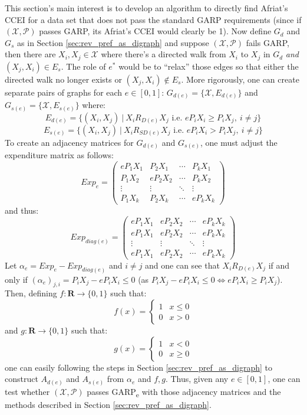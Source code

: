 \documentclass{article} %
\theoremstyle{style1}
\theoremstyle{example}
\begin{document}
This section's main interest is to develop an algorithm to directly find Afriat's CCEI for a data set that does not pass the standard GARP requirements (since if $(\mathcal{X},\mathcal{P})$ passes GARP, its Afriat's CCEI would clearly be 1). Now define $G_d$ and $G_s$ as in Section \ref{sec:rev_pref_as_digraph} and suppose $(\mathcal{X},\mathcal{P})$ fails GARP, then there are $X_i,X_j\in\mathcal{X}$ where there's a directed walk from $X_i$ to $X_j$ in $G_d$ \emph{and} $(X_j,X_i)\in E_s$. The role of $e^*$ would be to ``relax'' those edges so that either the directed walk no longer exists or $(X_j,X_i)\not\in E_s$. More rigorously, one can create separate pairs of graphs for each $e\in[0,1]$: $G_{d(e)}=\{\mathcal{X},E_{d(e)}\}$ and $G_{s(e)}=\{\mathcal{X},E_{s(e)}\}$ where:
$$E_{d(e)}=\{(X_i,X_j)\ |\ X_iR_{D(e)}X_j\textrm{ i.e. } eP_iX_i\geq P_iX_j,\ i\not=j\}$$
$$E_{s(e)}=\{(X_i,X_j)\ |\ X_iR_{SD(e)}X_j\textrm{ i.e. } eP_iX_i> P_iX_j,\ i\not=j\}$$
To create an adjacency matrices for $G_{d(e)}$ and $G_{s(e)}$, one must adjust the expenditure matrix as follows:
\[
Exp_e=
\begin{pmatrix}
eP_1X_1 & P_2X_1 & \cdots & P_kX_1\\
P_1X_2 & eP_2X_2 & \cdots & P_kX_2\\
\vdots & \vdots & \ddots & \vdots \\
P_1X_k & P_2X_k & \cdots & eP_kX_k 
\end{pmatrix}
\]
and thus:
\[
Exp_{diag(e)}=
\begin{pmatrix}
eP_1X_1 & eP_2X_2 & \cdots & eP_kX_k \\
eP_1X_1 & eP_2X_2 & \cdots & eP_kX_k \\
\vdots & \vdots & \ddots & \vdots \\
eP_1X_1 & eP_2X_2 & \cdots & eP_kX_k 
\end{pmatrix}
\]
Let $\alpha_e=Exp_e-Exp_{diag(e)}$ and $i\not=j$ and one can see that $X_i R_{D(e)} X_j$ if and only if $(\alpha_e)_{j,i}=P_iX_j-eP_iX_i\leq0$ (as $P_iX_j-eP_iX_i\leq0 \iff eP_iX_i\geq P_iX_j$). Then, defining $f:\mathbf{R}\to\{0,1\}$ such that:
\[f(x)=\begin{cases}
1 & x\leq 0\\
0 & x>0
\end{cases}
\]
and $g:\mathbf{R}\to\{0,1\}$ such that:
\[g(x)=\begin{cases}
1 & x<0\\
0 & x\geq0
\end{cases}
\]
one can easily following the steps in Section \ref{sec:rev_pref_as_digraph} to construct $A_{d(e)}$ and $A_{s(e)}$ from $\alpha_e$ and $f, g$. Thus, given any $e\in[0,1]$, one can test whether $(\mathcal{X},\mathcal{P})$ passes GARP\textsubscript{e} with those adjacency matrices and the methods described in Section \ref{sec:rev_pref_as_digraph}.
\end{document}

